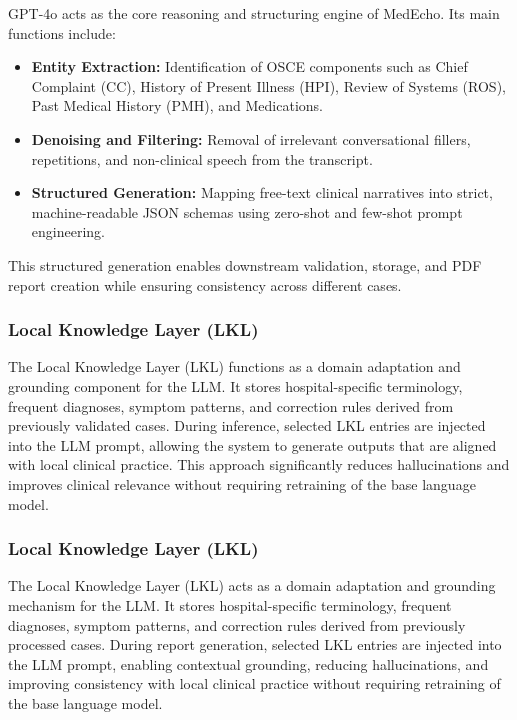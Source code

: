 GPT-4o acts as the core reasoning and structuring engine of MedEcho. Its main functions include:

\begin{itemize}
    \item \textbf{Entity Extraction:} Identification of OSCE components such as Chief Complaint (CC), History of Present Illness (HPI), Review of Systems (ROS), Past Medical History (PMH), and Medications.
    \item \textbf{Denoising and Filtering:} Removal of irrelevant conversational fillers, repetitions, and non-clinical speech from the transcript.
    \item \textbf{Structured Generation:} Mapping free-text clinical narratives into strict, machine-readable JSON schemas using zero-shot and few-shot prompt engineering.
\end{itemize}

This structured generation enables downstream validation, storage, and PDF report creation while ensuring consistency across different cases.

\subsubsection*{Local Knowledge Layer (LKL)}

The Local Knowledge Layer (LKL) functions as a domain adaptation and grounding component for the LLM. It stores hospital-specific terminology, frequent diagnoses, symptom patterns, and correction rules derived from previously validated cases. During inference, selected LKL entries are injected into the LLM prompt, allowing the system to generate outputs that are aligned with local clinical practice. This approach significantly reduces hallucinations and improves clinical relevance without requiring retraining of the base language model.


\subsubsection*{Local Knowledge Layer (LKL)}

The Local Knowledge Layer (LKL) acts as a domain adaptation and grounding mechanism for the LLM. It stores hospital-specific terminology, frequent diagnoses, symptom patterns, and correction rules derived from previously processed cases. During report generation, selected LKL entries are injected into the LLM prompt, enabling contextual grounding, reducing hallucinations, and improving consistency with local clinical practice without requiring retraining of the base language model.

